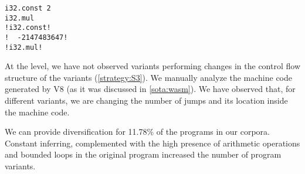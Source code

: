 {\begin{code}
\begin{minipage}[b]{0.32\linewidth}
\begin{minipage}[t]{0.46\linewidth}
            \begin{lstlisting}
i32.const 2
i32.mul
!i32.const!
!  -2147483647!
!i32.mul!
            \end{lstlisting}
        \end{minipage}
    \end{minipage}
    \end{code}
}

At the \wasm level, we have not observed variants performing changes in the control flow structure of the variants (\autoref{strategy:S3}). We manually analyze the machine code generated by V8 (as it was discussed in \autoref{sota:wasm}). We have observed that, for different variants, we are changing the number of jumps and its location inside the machine code. 

\begin{tcolorbox}[title=Answer to RQ1.,boxrule=2pt,arc=.3em,boxsep=1.5mm]
    We can provide diversification for 11.78\% of the programs in our corpora. Constant inferring, complemented with the high presence of arithmetic operations and bounded loops in the original program increased the number of program variants. 
\end{tcolorbox}



\begin{comment}

While our work is very limited by the provided corpora, it can be easily extended to other\dots

An application that benefits from the ablity of CROW is the large amount of generated variants. 


- CHeckLong questions for 80%
- Stress how to do experiments in Software Engineering, the theory behind how to do this in CS.
- The objects of the experiments are programs that ... 
- Motivate the corpora selection, size, can be ported, security sensitive, etc,
- Do not mention CROW in the selection criteria.
- The motivation is not related to tools, only to concepts
- Move paragraph after listing of coprpora to before.
- 


\end{comment}